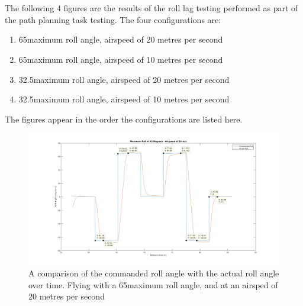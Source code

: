 \chapter{} 
\label{app:MATLABRoll}

\graphicspath{{Appendix4/Figs/}}

\renewcommand{\thefigure}{D\arabic{figure}}

\setcounter{figure}{0}

The following 4 figures are the results of the roll lag testing performed as part of the path planning task testing. The four configurations are:

\begin{enumerate}
	\item 65\degree  maximum roll angle, airspeed of 20 metres per second
	\item 65\degree  maximum roll angle, airspeed of 10 metres per second
	\item 32.5\degree  maximum roll angle, airspeed of 20 metres per second
	\item 32.5\degree  maximum roll angle, airspeed of 10 metres per second
\end{enumerate}

The figures appear in the order the configurations are listed here.

\begin{figure} 
\centering    
\includegraphics[scale=0.5]{65_20_cursors}
\caption{A comparison of the commanded roll angle with the actual roll angle over time. Flying with a 65\degree  maximum roll angle, and at an airsped of 20 metres per second}
\end{figure}

